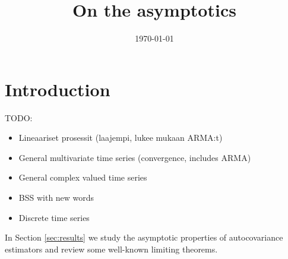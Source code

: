 \documentclass[11pt,a4paper,leqno]{amsart}
\newcommand{\1}{\mathbbm{1}}
\newcommand{\0}{\mathbf{0}}
\begin{document}

\theoremstyle{definition}
\newtheorem{dfn}{Definition}
\newtheorem{ass}{Assumption}
\theoremstyle{plain}
\newtheorem{thm}{Theorem}
\newtheorem{pro}{Proposition}
\newtheorem{cor}{Corollary}
\newtheorem{lma}{Lemma}
\theoremstyle{remark}
\newtheorem{rem}{Remark}
\newtheorem{exa}{Example}
\newtheorem{nts}{Note to Self}




 
\title[CLT]{On the asymptotics}
\date{\today}



\section{Introduction}
TODO:
\begin{itemize}
\item Lineaariset prosessit (laajempi, lukee mukaan ARMA:t)

\item General multivariate time series (convergence, includes ARMA)

\item General complex valued time series 

\item BSS with new words 

\item Discrete time series
\end{itemize}

In Section \ref{sec:results} we study the asymptotic properties of autocovariance estimators and review some well-known limiting theorems. 
\end{document}
